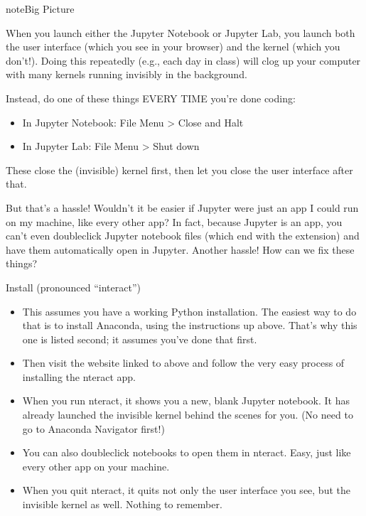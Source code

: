 \documentclass[letterpaper,10pt,english]{sphinxmanual}
\begin{document}
\begin{sphinxadmonition}{note}{Big Picture}

When you launch either the Jupyter Notebook or Jupyter Lab, you launch both the user interface (which you see in your browser) and the kernel (which you don’t!).    Doing this repeatedly (e.g., each day in class) will clog up your computer with many kernels running invisibly in the background.

Instead, do one of these things EVERY TIME you’re done coding:
\begin{itemize}
\item {} 
In Jupyter Notebook: File Menu > Close and Halt

\item {} 
In Jupyter Lab: File Menu > Shut down

\end{itemize}

These close the (invisible) kernel first, then let you close the user interface after that.
\end{sphinxadmonition}

But that’s a hassle!  Wouldn’t it be easier if Jupyter were just an app I could run on my machine, like every other app?  In fact, because Jupyter is  an app, you can’t even double\sphinxhyphen{}click Jupyter notebook files (which end with the  extension) and have them automatically open in Jupyter.  Another hassle!  How can we fix these things?

  Install  (pronounced “interact”)
\begin{itemize}
\item {} 
This assumes you have a working Python installation.  The easiest way to do that is to install Anaconda, using the instructions up above.  That’s why this one is listed second; it assumes you’ve done that first.

\item {} 
Then visit the website linked to above and follow the very easy process of installing the nteract app.

\item {} 
When you run nteract, it shows you a new, blank Jupyter notebook.  It has already launched the invisible kernel behind the scenes for you.  (No need to go to Anaconda Navigator first!)

\item {} 
You can also double\sphinxhyphen{}click notebooks to open them in nteract.  Easy, just like every other app on your machine.

\item {} 
When you quit nteract, it quits not only the user interface you see, but the invisible kernel as well.  Nothing to remember.

\end{itemize}
\end{document}
